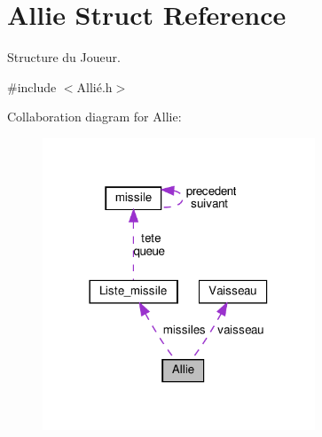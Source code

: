 \hypertarget{struct_allie}{}\section{Allie Struct Reference}
\label{struct_allie}


Structure du Joueur.  




{\ttfamily \#include $<$Allié.\+h$>$}



Collaboration diagram for Allie\+:
\nopagebreak
\begin{figure}[H]
\begin{center}
\leavevmode
\includegraphics[width=230pt]{struct_allie__coll__graph}
\end{center}
\end{figure}
